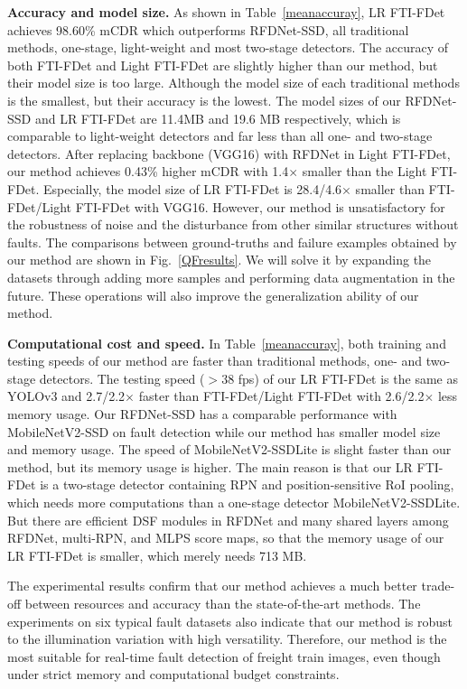 \textbf{Accuracy and model size.}
As shown in Table~\ref{meanaccuray}, LR FTI-FDet achieves 98.60\% mCDR which outperforms RFDNet-SSD, all traditional methods, one-stage, light-weight and most two-stage detectors. The accuracy of both FTI-FDet and Light FTI-FDet are slightly higher than our method, but their model size is too large. Although the model size of each traditional methods is the smallest, but their accuracy is the lowest. The model sizes of our RFDNet-SSD and LR FTI-FDet are 11.4MB and 19.6 MB respectively, which is comparable to light-weight detectors and far less than all one- and two-stage detectors. After replacing backbone (VGG16) with RFDNet in Light FTI-FDet, our method achieves 0.43\% higher mCDR with 1.4$\times$ smaller than the Light FTI-FDet. Especially, the model size of LR FTI-FDet is 28.4/4.6$\times$ smaller than FTI-FDet/Light FTI-FDet with VGG16.
However, our method is unsatisfactory for the robustness of noise and the disturbance from other similar structures without faults. The comparisons between ground-truths and failure examples obtained by our method are shown in Fig.~\ref{QFresults}. We will solve it by expanding the datasets through adding more samples and performing data augmentation in the future. These operations will also improve the generalization ability of our method.

\textbf{Computational cost and speed.}
In Table~\ref{meanaccuray}, both training and testing speeds of our method are faster than traditional methods, one- and two-stage detectors. The testing speed ($>$38 fps) of our LR FTI-FDet is the same as YOLOv3 and 2.7/2.2$\times$ faster than FTI-FDet/Light FTI-FDet with 2.6/2.2$\times$ less memory usage. Our RFDNet-SSD has a comparable performance with MobileNetV2-SSD on fault detection while our method has smaller model size and memory usage. The speed of MobileNetV2-SSDLite is slight faster than our method, but its memory usage is higher. The main reason is that our LR FTI-FDet is a two-stage detector containing RPN and position-sensitive RoI pooling, which needs more computations than a one-stage detector MobileNetV2-SSDLite. But there are efficient DSF modules in RFDNet and many shared layers among RFDNet, multi-RPN, and MLPS score maps, so that the memory usage of our LR FTI-FDet is smaller, which merely needs 713 MB.

The experimental results confirm that our method achieves a much better trade-off between resources and accuracy than the state-of-the-art methods. The experiments on six typical fault datasets also indicate that our method is robust to the illumination variation with high versatility. Therefore, our method is the most suitable for real-time fault detection of freight train images, even though under strict memory and computational budget constraints.

